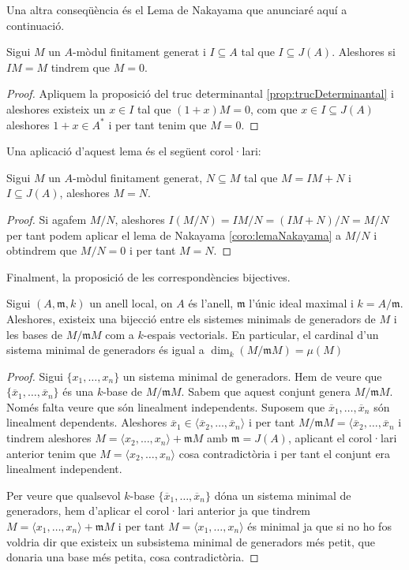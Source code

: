 \documentclass[../../../main.tex]{subfiles}
\begin{document}
Una altra conseqüència és el Lema de Nakayama que anunciaré aquí a continuació.

\begin{coro}
\label{coro:lemaNakayama} Sigui $M$ un $A$-mòdul finitament generat i $I\subseteq A$ tal que $I\subseteq J(A)$. Aleshores si $IM =M$ tindrem que $M = 0$.
\end{coro}
\begin{proof}
Apliquem la proposició del truc determinantal \ref{prop:trucDeterminantal} i aleshores existeix un $x\in I$ tal que $(1+x)M = 0$, com que $x\in I\subseteq J(A)$ aleshores $1+x\in A^*$ i per tant tenim que $M = 0$.
\end{proof}

Una aplicació d'aquest lema és el següent corol·lari:

\begin{coro}
Sigui $M$ un $A$-mòdul finitament generat, $N\subseteq M$ tal que $M = IM+N$ i $I\subseteq J(A)$, aleshores $M = N$.
\end{coro}
\begin{proof}
Si agafem $M/N$, aleshores $I(M/N) = IM/N = (IM+N)/N = M/N$ per tant podem aplicar el lema de Nakayama \ref{coro:lemaNakayama} a $M/N$ i obtindrem que $M/N = 0$ i per tant $M = N$.
\end{proof}


Finalment, la proposició de les correspondències bijectives.

\begin{prop}
\label{prop:correspondenciesBijectivesSistemesMinimals} Sigui $(A,\mathfrak{m},k)$ un anell local, on $A$ és l'anell, $\mathfrak{m}$ l'únic ideal maximal i $k = A/\mathfrak{m}$. Aleshores, existeix una bijecció entre els sistemes minimals de generadors de $M$ i les bases de $M/\mathfrak{m}M$ com a $k$-espais vectorials. En particular, el cardinal d'un sistema minimal de generadors és igual a $\dim_k(M/\mathfrak{m}M) = \mu(M)$
\end{prop}
\begin{proof}
Sigui $\{x_1,\ldots,x_n\}$ un sistema minimal de generadors. Hem de veure que $\{\overline{x}_1,\ldots,\overline{x}_n\}$ és una $k$-base de $M/\mathfrak{m}M$. Sabem que aquest conjunt genera $M/\mathfrak{m}M$. Només falta veure que són linealment independents. Suposem que $\overline{x}_1,\ldots,\overline{x}_n$ són linealment dependents. Aleshores $\overline{x}_1\in\langle \overline{x}_2,\ldots,\overline{x}_n\rangle$ i per tant $M/\mathfrak{m}M = \langle \overline{x}_2,\ldots,\overline{x}_n$ i tindrem aleshores $M = \langle x_2,\ldots,x_n\rangle + \mathfrak{m}M$ amb $\mathfrak{m} = J(A)$, aplicant el corol·lari anterior tenim que $M = \langle x_2,\ldots,x_n\rangle$ cosa contradictòria i per tant el conjunt era linealment independent.

Per veure que qualsevol $k$-base $\{\overline{x}_1,\ldots,\overline{x}_n\}$ dóna un sistema minimal de generadors, hem d'aplicar el corol·lari anterior ja que tindrem $M = \langle x_1,\ldots,x_n\rangle + \mathfrak{m}M$ i per tant $M = \langle x_1,\ldots,x_n\rangle$ és minimal ja que si no ho fos voldria dir que existeix un subsistema minimal de generadors més petit, que donaria una base més petita, cosa contradictòria.
\end{proof}
\end{document}
